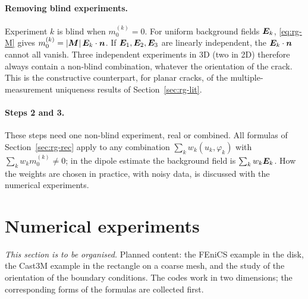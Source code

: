 \paragraph{Removing blind experiments.} Experiment $k$ is blind when $m_0^{(k)}=0$. For uniform background fields $\bm{E}_k$, \eqref{eq:rg-M} gives $m_0^{(k)}=|\bm{M}|\,\bm{E}_k\cdot\bm{n}$. If $\bm{E}_1,\bm{E}_2,\bm{E}_3$ are linearly independent, the $\bm{E}_k\cdot\bm{n}$ cannot all vanish. Three independent experiments in 3D (two in 2D) therefore always contain a non-blind combination, whatever the orientation of the crack. This is the constructive counterpart, for planar cracks, of the multiple-measurement uniqueness results of Section~\ref{sec:rg-lit}.

\paragraph{Steps 2 and 3.} These steps need one non-blind experiment, real or combined. All formulas of Section~\ref{sec:rg-rec} apply to any combination $\sum_kw_k(u_k,\varphi_k)$ with $\sum_kw_km_0^{(k)}\ne0$; in the dipole estimate the background field is $\sum_kw_k\bm{E}_k$. How the weights are chosen in practice, with noisy data, is discussed with the numerical experiments.

\section{Numerical experiments}\label{sec:rg-num}
\emph{This section is to be organised.} Planned content: the FEniCS example in the disk, the Cast3M example in the rectangle on a coarse mesh, and the study of the orientation of the boundary conditions. The codes work in two dimensions; the corresponding forms of the formulas are collected first.

